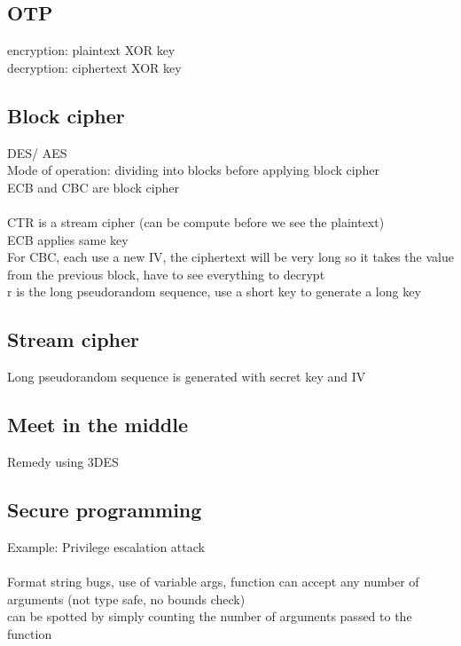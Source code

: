 \documentclass[11pt]{article}
\begin{document}
\begin{multicols*}{3}
\subsection*{OTP}
encryption: plaintext XOR key\\
decryption: ciphertext XOR key
\subsection*{Block cipher}
DES/ AES \\
Mode of operation: dividing into blocks before applying block cipher\\
ECB and CBC are block cipher\\\\
CTR is a stream cipher (can be compute before we see the plaintext)\\
ECB applies same key\\
For CBC, each use a new IV, the ciphertext will be very long so it takes the value from the previous block, have to see everything to decrypt\\
r is the long pseudorandom sequence, use a short key to generate a long key
\subsection*{Stream cipher}
Long pseudorandom sequence is generated with secret key and IV
\subsection*{Meet in the middle}
Remedy using 3DES
\\
\subsection*{Secure programming}
Example: Privilege escalation attack\\\\
Format string bugs, use of variable args, function can accept any number of arguments (not type safe, no bounds check)\\
 can be spotted by simply counting the number of arguments passed to the function\\
 \\

\end{multicols*}
\end{document}
